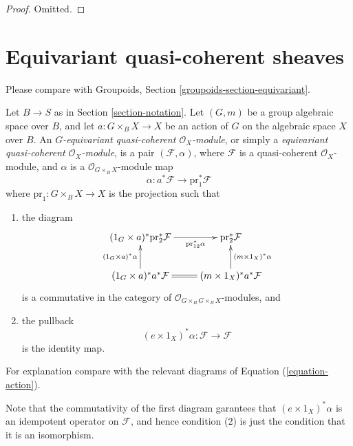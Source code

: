\begin{proof}
Omitted.
\end{proof}















\section{Equivariant quasi-coherent sheaves}
\label{section-equivariant}

\noindent
Please compare with
Groupoids, Section \ref{groupoids-section-equivariant}.

\begin{definition}
\label{definition-equivariant-module}
Let $B \to S$ as in Section \ref{section-notation}.
Let $(G, m)$ be a group algebraic space over $B$, and
let $a : G \times_B X \to X$ be an action of $G$
on the algebraic space $X$ over $B$.
An {\it $G$-equivariant quasi-coherent $\mathcal{O}_X$-module},
or simply a {\it equivariant quasi-coherent $\mathcal{O}_X$-module},
is a pair $(\mathcal{F}, \alpha)$, where $\mathcal{F}$ is a quasi-coherent
$\mathcal{O}_X$-module, and $\alpha$ is a $\mathcal{O}_{G \times_B X}$-module
map
$$
\alpha : a^*\mathcal{F} \longrightarrow \text{pr}_1^*\mathcal{F}
$$
where $\text{pr}_1 : G \times_B X \to X$ is the projection
such that
\begin{enumerate}
\item the diagram
$$
\xymatrix{
(1_G \times a)^*\text{pr}_2^*\mathcal{F} \ar[r]_-{\text{pr}_{12}^*\alpha} &
\text{pr}_2^*\mathcal{F} \\
(1_G \times a)^*a^*\mathcal{F} \ar[u]^{(1_G \times a)^*\alpha} \ar@{=}[r] &
(m \times 1_X)^*a^*\mathcal{F} \ar[u]_{(m \times 1_X)^*\alpha}
}
$$
is a commutative in the category of
$\mathcal{O}_{G \times_B G \times_B X}$-modules, and
\item the pullback
$$
(e \times 1_X)^*\alpha : \mathcal{F} \longrightarrow \mathcal{F}
$$
is the identity map.
\end{enumerate}
For explanation compare with the relevant diagrams of
Equation (\ref{equation-action}).
\end{definition}

\noindent
Note that the commutativity of the first diagram garantees that
$(e \times 1_X)^*\alpha$ is an idempotent operator on $\mathcal{F}$,
and hence condition (2) is just the condition that it is an isomorphism.

